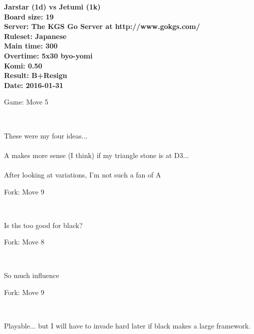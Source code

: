 \documentclass{article}
\begin{document}
\begin{titlepage}
    \null
    \vfill
    \begin{center}
        \textbf{Jarstar (1d) vs Jetumi (1k)}\\
        \textbf{Board size: 19}\\
        \textbf{Server: The KGS Go Server at http://www.gokgs.com/}\\
        \textbf{Ruleset: Japanese}\\
        \textbf{Main time: 300}\\
        \textbf{Overtime: 5x30 byo-yomi}\\
        \textbf{Komi: 0.50}\\
        \textbf{Result: B+Resign}\\
        \textbf{Date: 2016-01-31}
    \end{center}
    \vfill
\end{titlepage}
\newpage
\tableofcontents
\newpage
\begin{section}{Game: Move 5}
\begin{center}
\cleargoban
{}
\showfullgoban
\\\parbox{4.5in}{
These were my four ideas...\\\\A makes more sense (I think)  if my triangle stone is at D3...\\\\After looking at variations, I'm not such a fan of A}
\end{center}
\end{section}
\begin{subsection}{Fork: Move 9}
\begin{center}
\cleargoban
{}
\showfullgoban
\\\parbox{4.5in}{
Is ths too good for black?}
\end{center}
\end{subsection}
\begin{subsection}{Fork: Move 8}
\begin{center}
\cleargoban
{}
\showfullgoban
\\\parbox{4.5in}{
So much influence}
\end{center}
\end{subsection}
\begin{subsection}{Fork: Move 9}
\begin{center}
\cleargoban
{}
\showfullgoban
\\\parbox{4.5in}{
Playable... but I will have to invade hard later if black makes a large framework.}
\end{center}
\end{subsection}
\end{document}
